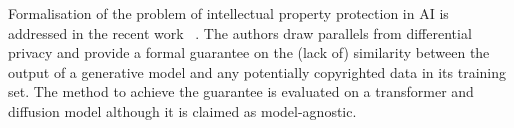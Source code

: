 \documentclass[conference,table]{IEEEtran} %
\begin{document}
Formalisation of the problem of intellectual property protection in AI is addressed in the recent work ~\cite{vyas_provable_2023}. 
The authors draw parallels from differential privacy and provide a formal guarantee on the (lack of) similarity between the output of a generative model and any potentially copyrighted data in its training set. 
The method to achieve the guarantee is evaluated on a transformer and diffusion model although it is claimed as model-agnostic.






\end{document}
